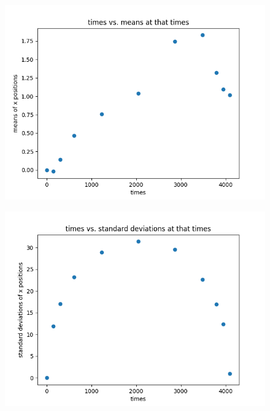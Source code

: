 \documentclass[xelatex,ja=standard]{bxjsarticle}
\begin{document}
\begin{figure}[htbp]
    \centering
    \includegraphics[scale=0.7]
{7-2.png}
    \label{fig:1}
\end{figure}

\begin{figure}[htbp]
    \centering
    \includegraphics[scale=0.7]
{7-3.png}
    \label{fig:1}
\end{figure}
\end{document}

